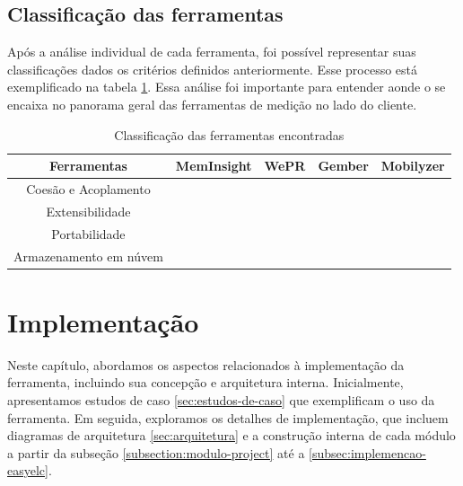\documentclass[12pt]{tcc}
\newcommand{\cmark}{\ding{51}}
\newcommand{\xmark}{\ding{55}}
\begin{document}
	\section{Classificação das ferramentas}
	\label{section:analise-ferramentas}
	Após a análise individual de cada ferramenta, foi possível representar suas classificações dados os critérios definidos anteriormente. Esse processo está exemplificado na tabela \ref{table:classificacao-sem-elc}. Essa análise foi importante para entender aonde o  se encaixa no panorama geral das ferramentas de medição no lado do cliente.

	\begin{table}[ht]
	\caption{Classificação das ferramentas encontradas} %
	\centering %
	\begin{tabular}{c c c c c } %
	\toprule %

	\textbf{Ferramentas} &\textbf{MemInsight} & \textbf{WePR} & \textbf{Gember} & \textbf{Mobilyzer}  \\ [0.4ex]

	\midrule %
	Coesão e Acoplamento & \cmark & \cmark & \cmark & \cmark   \\
	Extensibilidade & \xmark & \xmark & \xmark & \xmark  \\
	Portabilidade & \cmark & \xmark & \xmark & \xmark  \\
	Armazenamento em núvem & \xmark & \cmark & \cmark & \cmark  \\
	\bottomrule %
	\end{tabular}
	\label{table:classificacao-sem-elc} %
	\end{table}
\chapter{Implementação}
	\label{cap:implementação}


	Neste capítulo, abordamos os aspectos relacionados à implementação da ferramenta, incluindo sua concepção e arquitetura interna.
	Inicialmente, apresentamos estudos de caso \ref{sec:estudos-de-caso} que exemplificam o uso da ferramenta.
	Em seguida, exploramos os detalhes de implementação, que incluem diagramas de arquitetura \ref{sec:arquitetura} e a construção interna de cada módulo a partir da subseção \ref{subsection:modulo-project} até a \ref{subsec:implemencao-easyelc}.
\end{document}
